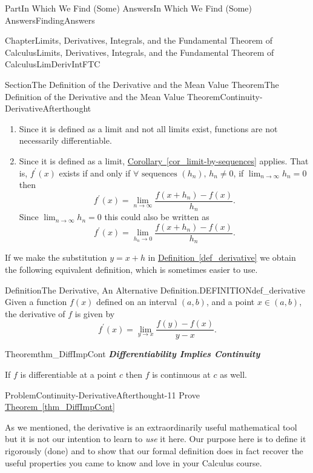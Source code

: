 \documentclass[oneside,10pt,]{book}
\newcommand{\xreffont}{\relax}
\newcommand{\alert}[1]{\textbf{\textit{#1}}}
\numberwithin{equation}{part}
\def\limit#1#2#3{{\displaystyle\lim_{#1\rightarrow #2}#3}}
\begin{document}
\begin{partptx}{Part}{In Which We Find (Some) Answers}{}{In Which We Find (Some) Answers}{}{}{FindingAnswers}
\begin{chapterptx}{Chapter}{Limits, Derivatives, Integrals, and the Fundamental Theorem of Calculus}{}{Limits, Derivatives, Integrals, and the Fundamental Theorem of Calculus}{}{}{LimDerivIntFTC}
\begin{sectionptx}{Section}{The Definition of  the Derivative and the Mean Value Theorem}{}{The Definition of  the Derivative and the Mean Value Theorem}{}{}{Continuity-DerivativeAfterthought}
\begin{enumerate}
\item{}Since it is defined as a limit and not all limits exist, functions are not necessarily differentiable.%
\item{}Since it is defined as a limit, \hyperref[cor_limit-by-sequences]{Corollary~{\xreffont\ref{cor_limit-by-sequences}}} applies.  That is, \(f^\prime(x)\) exists if and only if \(\forall \text{ sequences } (h_n),\, h_n\ne
0\), if \(\limit{n}{\infty}{h_n}=0\) then%
\begin{equation*}
f^\prime{(x)} =
\limit{n}{\infty}{\frac{f(x+h_n)-f(x)}{h_n}} \text{.}
\end{equation*}
Since \(\limit{n}{\infty}{h_n}=0\) this could also be written as%
\begin{equation*}
f^\prime{(x)} =
\limit{h_n}{0}{\frac{f(x+h_n)-f(x)}{h_n}}\text{.}
\end{equation*}
%
\end{enumerate}
%
\par
If we make the substitution \(y=x+h\) in \hyperref[def_derivative]{Definition~{\xreffont\ref{def_derivative}}}  we obtain the following equivalent definition, which is sometimes easier to use.%
\begin{definition}{Definition}{The Derivative, An Alternative Definition.}{DEFINITIONdef_derivative}%
Given a function \(f(x)\) defined on an interval \((a,b)\), and a point \(x\in (a,b)\), the derivative of \(f\) is given by%
\begin{equation*}
f^\prime(x)=\limit{y}{x}{\frac{f(y)-f(x)}{y-x}}\text{.}
\end{equation*}
%
\end{definition}
\begin{theorem}{Theorem}{}{}{thm_DiffImpCont}%
%
%
\alert{Differentiability Implies Continuity}%
\par
If \(f\) is differentiable at a point \(c\) then \(f\) is continuous at \(c\) as well.%
\end{theorem}
\begin{problem}{Problem}{}{Continuity-DerivativeAfterthought-11}%
Prove \hyperref[thm_DiffImpCont]{Theorem~{\xreffont\ref{thm_DiffImpCont}}}%
\end{problem}
As we mentioned, the derivative is an extraordinarily useful mathematical tool but it is not our intention to learn to \emph{use} it here.  Our purpose here is to define it rigorously (done) and to show that our formal definition does in fact recover the useful properties you came to know and love in your Calculus course.%

\end{sectionptx}
\end{chapterptx}
\end{partptx}
\end{document}
